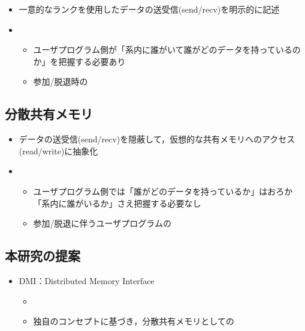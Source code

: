 \documentclass[25pt,landscape,papersize]{jsarticle}
\begin{document}
\begin{itemize}
\item 一意的なランクを使用したデータの送受信(send/recv)を明示的に記述
\item {}
  \begin{itemize}
  \item ユーザプログラム側が「系内に誰がいて誰がどのデータを持っているのか」を把握する必要あり
  \item 参加/脱退時の
  \end{itemize}
\end{itemize}

\subsection{分散共有メモリ}

\begin{itemize}
\item データの送受信(send/recv)を隠蔽して，仮想的な共有メモリへのアクセス(read/write)に抽象化
\item {}
  \begin{itemize}
  \item ユーザプログラム側では「誰がどのデータを持っているか」はおろか
    「系内に誰がいるか」さえ把握する必要なし
  \item 参加/脱退に伴うユーザプログラムの
  \end{itemize}
\end{itemize}


\subsection{本研究の提案}

\begin{itemize}
\item DMI：Distributed Memory Interface
  \begin{itemize}
  \item {}
  \item 独自のコンセプトに基づき，分散共有メモリとしての
  \end{itemize}
\end{itemize}
\end{document}

